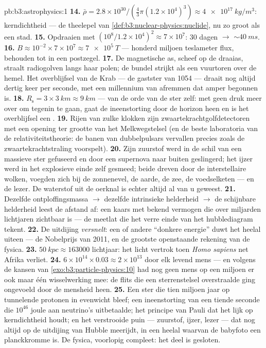 \begin{solution}{pb:b3:astrophysics:1}
\textbf{14.} $\bar\rho = 2.8\times10^{30}/(\tfrac43\pi
(1.2\times10^4)^3) \approx \qty{4e17}{kg/m^3}$: kerndichtheid
--- de theelepel van \cref{def:b3:nuclear-physics:nuclide},
nu zo groot als een stad.
\textbf{15.} Opdraaien met $(10^8/1.2\times10^4)^2 \approx
7\times10^{7}$: 30 dagen $\to$ ${\sim}\qty{40}{ms}$.
\textbf{16.} $B \approx 10^{-2}\times7\times10^{7} \approx
\qty{7e5}{T}$ --- honderd miljoen teslameter flux,
behouden tot in een postzegel.
\textbf{17.} De magnetische as, scheef op de draaias,
straalt radiogolven langs haar polen; de bundel strijkt als een
vuurtoren over de hemel. Het overblijfsel van de Krab --- de gastster van 1054 --- draait
nog altijd dertig keer per seconde, met een millennium van afremmen dat amper
begonnen is.
\textbf{18.} $R_{\text{s}} = 3\times\qty{3}{km} \approx
\qty{9}{km}$ --- van de orde van de ster zelf: met geen druk meer
over om tegenin te gaan, gaat de ineenstorting door de horizon heen
en is het overblijfsel een .
\textbf{19.} Rijen van zulke klokken zijn zwaartekrachtgolfdetectoren
met een opening ter grootte van het Melkwegstelsel (en de beste laboratoria van de
relativiteitstheorie: de banen van dubbelpulsars vervallen precies zoals
de zwaartekrachtstraling voorspelt).
\textbf{20.} Zijn zuurstof werd in de schil van een massieve ster gefuseerd
en door een supernova naar buiten geslingerd; het ijzer werd in het
explosieve einde zelf gesmeed; beide dreven door de interstellaire wolken,
voegden zich bij de zonnenevel, de aarde, de zee, de voedselketen
--- en de lezer. De waterstof uit de oerknal is echter altijd al
van u geweest.
\textbf{21.} Dezelfde ontploffingsmassa $\to$ dezelfde intrinsieke
helderheid $\to$ de schijnbare helderheid leest de afstand af: een kaars
met bekend vermogen die over miljarden lichtjaren zichtbaar is ---
de meetlat die het verre einde van het hubblediagram tekent.
\textbf{22.} De uitdijing \emph{versnelt}: een of andere
``donkere energie'' duwt het heelal uiteen --- de Nobelprijs van 2011,
en de grootste openstaande rekening van de fysica.
\textbf{23.} $\qty{50}{kpc} \approx 163000$ lichtjaar: het
licht vertrok toen \emph{Homo sapiens} net Afrika verliet.
\textbf{24.} $6\times10^{14}\times0.03 \approx 2\times10^{13}$
door elk levend mens --- en volgens de kansen van
\cref{exo:b3:particle-physics:10} had nog geen mens op een
miljoen er ook maar één wisselwerking mee: de flits die een
sterrenstelsel overstraalde ging ongevoeld door de mensheid heen.
\textbf{25.} Een ster die tien miljoen jaar op tunnelende
protonen in evenwicht bleef; een ineenstorting van een tiende seconde die $10^{46}$
joule aan neutrino's uitbetaalde; het principe van Pauli dat het lijk op
kerndichtheid houdt; en het verstrooide puin --- zuurstof, ijzer,
lezer --- dat nog altijd op de uitdijing van Hubble meerijdt, in een heelal waarvan de
babyfoto een planckkromme is. De fysica, voorlopig compleet:
het deel is gesloten.
\end{solution}
